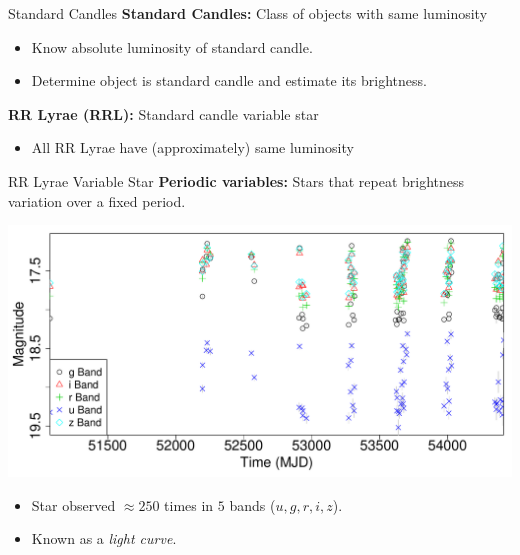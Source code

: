 \documentclass[12pt]{beamer}
\begin{document}
\begin{frame}{Standard Candles}
  \textbf{Standard Candles:} Class of objects with same luminosity
  \begin{itemize}
  \item Know absolute luminosity of standard candle.
  \item Determine object is standard candle and estimate its brightness.
  \end{itemize}

  \vspace{.3in}
  
  \textbf{RR Lyrae (RRL):} Standard candle variable star
  \begin{itemize}
  \item All RR Lyrae have (approximately) same luminosity
  \end{itemize}
\end{frame}

\begin{frame}{RR Lyrae Variable Star}
\textbf{Periodic variables:} Stars that repeat brightness variation over a fixed period.
\begin{center}
\includegraphics[scale=.3]{figs/unfolded_13350.pdf}
\end{center}


  \begin{itemize}
    \item Star observed $\approx 250$ times in $5$ bands ($u,g,r,i,z$).
    \item Known as a \textit{light curve}.
  \end{itemize}

\end{frame}
\end{document}
